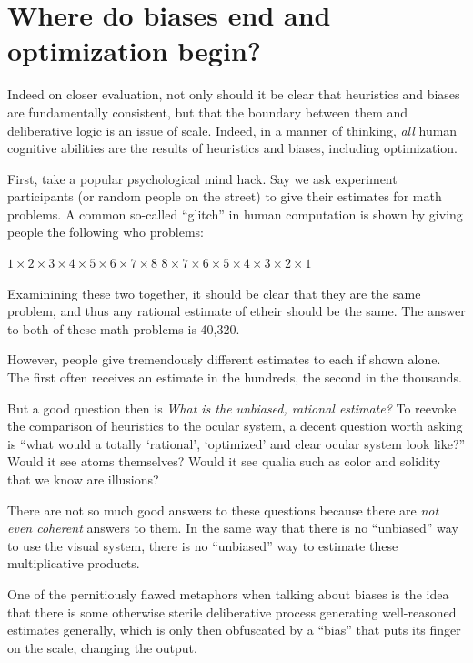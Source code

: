\documentclass{article}
\begin{document}
\section{Where do biases end and optimization begin?}

Indeed on closer evaluation, not only should it be clear that heuristics and biases are fundamentally consistent, but that the boundary between them and deliberative logic is an issue of scale. Indeed, in a manner of thinking, \emph{all} human cognitive abilities are the results of heuristics and biases, including optimization.

First, take a popular psychological mind hack.
Say we ask experiment participants (or random people on the street) to give their estimates for math problems.
A common so-called ``glitch'' in human computation is shown by giving people the following who problems:

\begin{exe}
	\ex $1\times2\times3\times4\times5\times6\times7\times8$
	\ex $8\times7\times6\times5\times4\times3\times2\times1$
\end{exe}

Examinining these two together, it should be clear that they are the same problem, and thus any rational estimate of etheir should be the same.
The answer to both of these math problems is 40,320.

However, people give tremendously different estimates to each if shown alone.
The first often receives an estimate in the hundreds, the second in the thousands.

But a good question then is \textit{What is the \emph{unbiased}, rational estimate?}
To reevoke the comparison of heuristics to the ocular system, a decent question worth asking is ``what would a totally `rational', `optimized' and clear ocular system look like?''
Would it see atoms themselves?
Would it see qualia such as color and solidity that we know are illusions?

There are not so much good answers to these questions because there are \emph{not even coherent} answers to them.
In the same way that there is no ``unbiased'' way to use the visual system, there is no ``unbiased'' way to estimate these multiplicative products.

One of the pernitiously flawed metaphors when talking about biases is the idea that there is some otherwise sterile deliberative process generating well-reasoned estimates generally, which is only then obfuscated by a ``bias'' that puts its finger on the scale, changing the output.
\end{document}
